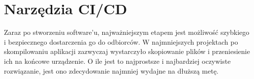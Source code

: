 \section{Narzędzia CI/CD}


Zaraz po stworzeniu software'u, najważniejszym etapem jest możliwość szybkiego i bezpiecznego dostarczenia go do odbiorców.
W najmniejszych projektach po skompilowaniu aplikacji zazwyczaj wystarczyło skopiowanie plików
i przeniesienie ich na końcowe urządzenie. O ile jest to najprostsze i najbardziej oczywiste rozwiązanie,
jest ono zdecydowanie najmniej wydajne na dłuższą metę.





\newpage





